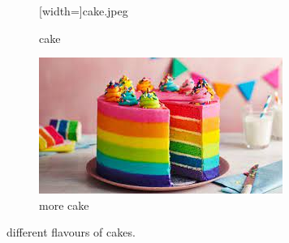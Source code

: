 \documentclass{article}
\begin{document}
	\begin{figure}[h!]
	 \centering
	 \begin{subfigure}[b]{0.4\linewidth}
	 	
	 [width=\linewidth]{cake.jpeg}
	 \caption{cake}
	  \end{subfigure}
  \begin{subfigure}[b]{0.4\linewidth}
  	
  	\includegraphics[width=\linewidth]{more cake.jpeg}
  	\caption{more cake}
  	 \end{subfigure}
		\caption{different flavours of cakes.}
		\label{fig:cake}
	\end{figure}
\end{document}

